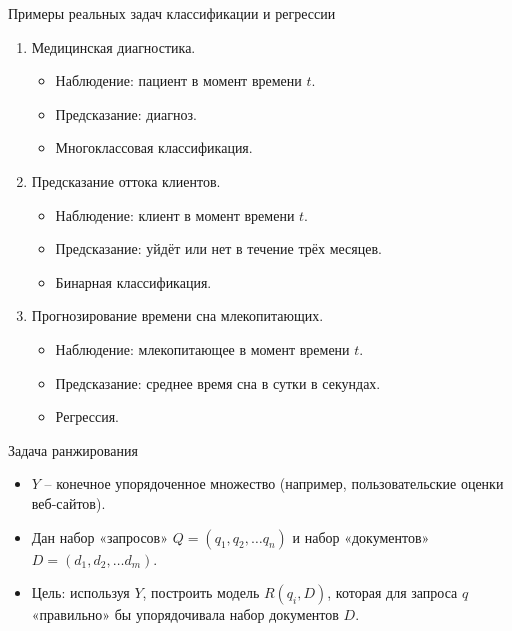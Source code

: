 \documentclass[c, handout]{beamer} %
\begin{document}
	\begin{frame}{Примеры реальных задач классификации и регрессии}
		\begin{enumerate}
			\item Медицинская диагностика.
			\begin{itemize}
				\item Наблюдение: пациент в момент времени $t$.
				\item Предсказание: диагноз.
				\item Многоклассовая классификация.
			\end{itemize}
			\item Предсказание оттока клиентов.
			\begin{itemize}
				\item Наблюдение: клиент в момент времени $t$.
				\item Предсказание: уйдёт или нет в течение трёх месяцев.
				\item Бинарная классификация.
			\end{itemize}
			\item Прогнозирование времени сна млекопитающих.
			 \begin{itemize}
			 	\item Наблюдение: млекопитающее в момент времени $t$.
			 	\item Предсказание: среднее время сна в сутки в секундах.
			 	\item Регрессия.
			 \end{itemize}
		\end{enumerate}
	\end{frame}

	\begin{frame}{Задача ранжирования}
		\begin{itemize}
			\item $Y$ – конечное упорядоченное множество (например, пользовательские оценки веб-сайтов).
			\item Дан набор «запросов» $Q = (q_1, q_2, \ldots q_n)$ и набор «документов» $D = (d_1, d_2, \ldots d_m)$.
			\item Цель: используя $Y$, построить модель $R(q_i, D)$, которая для запроса $q$ «правильно» бы упорядочивала набор документов $D$.
		\end{itemize}
		
	\end{frame}
\end{document}
